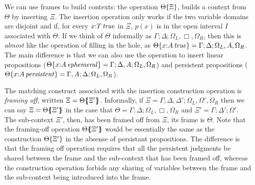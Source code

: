 We can use frames to build contexts: the operation
${\Theta}\{{\Xi}\}$, builds a context from $\Theta$ by inserting
$\Xi$. The insertion operation only works if the two variable domains
are disjoint and if, for every $x{:}{T}\,{{\it true}}$ in $\Xi$, $p(x)$ is in
the open interval $I$ associated with $\Theta$.  If we think of
$\Theta$ informally as 
$\Gamma; \Delta; \Omega_L, \Box, \Omega_R$, then this is
{\it almost} like the operation of filling in the hole, as
${\Theta}\{{x{:}{A}\,{{\it true}}}\} = \Gamma; \Delta; \Omega_L, A,
\Omega_R$. The main difference is that we can also use the operation to 
insert linear
propositions (${\Theta}\{{x{:}{A}\,{{\it ephemeral}}}\} = \Gamma;
\Delta, A; \Omega_L, \Omega_R$) and persistent propositions
(${\Theta}\{{x{:}{A}\,{{\it persistent}}}\} = \Gamma, A; \Delta;
\Omega_L, \Omega_R$).

The matching construct associated with the insertion construction 
operation is {\it framing off}, written 
$\Xi = {\Theta}\mbox{$\{\hspace{-4pt}\{$}{\Xi'}\mbox{$\}\hspace{-4pt}\}$}$. Informally, if
$\Xi = \Gamma; \Delta, \Delta'; \Omega_L, \Omega', \Omega_R$ then we can say
$\Xi = {\Theta}\mbox{$\{\hspace{-4pt}\{$}{\Xi'}\mbox{$\}\hspace{-4pt}\}$}$ in the case that
$\Theta = \Gamma; \Delta; \Omega_L, \Box, \Omega_R$ and
$\Xi' = \Gamma; \Delta'; \Omega'$. The sub-context $\Xi'$, then, has
been framed off from $\Xi$, its frame is $\Theta$. Note that the
framing-off operation ${\Theta}\mbox{$\{\hspace{-4pt}\{$}{\Xi'}\mbox{$\}\hspace{-4pt}\}$}$ would
be essentially the same as the construction ${\Theta}\{{\Xi'}\}$
in the absense of persistant propositions. The difference is that the 
framing off operation requires that all the persistent judgments be
shared between the frame and the sub-context that has been framed off,
whereas the construction operation forbids any sharing of variables
between the frame and the sub-context being introduced into the frame.

